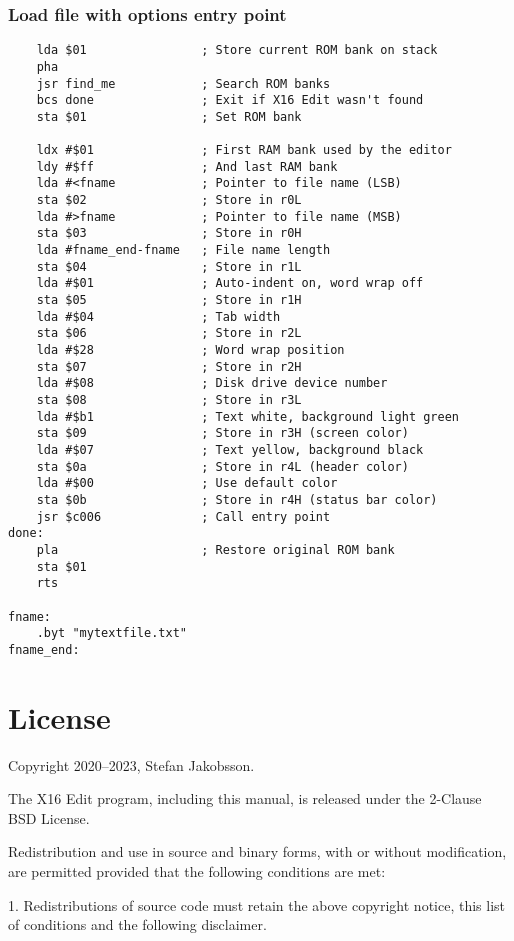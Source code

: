 \documentclass{article}
\begin{document}
    \subsubsection{Load file with options entry point}
\begin{verbatim}
    lda $01                ; Store current ROM bank on stack
    pha
    jsr find_me            ; Search ROM banks
    bcs done               ; Exit if X16 Edit wasn't found
    sta $01                ; Set ROM bank
    
    ldx #$01               ; First RAM bank used by the editor
    ldy #$ff               ; And last RAM bank
    lda #<fname            ; Pointer to file name (LSB)
    sta $02                ; Store in r0L
    lda #>fname            ; Pointer to file name (MSB)
    sta $03                ; Store in r0H
    lda #fname_end-fname   ; File name length
    sta $04                ; Store in r1L
    lda #$01               ; Auto-indent on, word wrap off
    sta $05                ; Store in r1H
    lda #$04               ; Tab width
    sta $06                ; Store in r2L
    lda #$28               ; Word wrap position
    sta $07                ; Store in r2H
    lda #$08               ; Disk drive device number
    sta $08                ; Store in r3L
    lda #$b1               ; Text white, background light green
    sta $09                ; Store in r3H (screen color)
    lda #$07               ; Text yellow, background black
    sta $0a                ; Store in r4L (header color)
    lda #$00               ; Use default color
    sta $0b                ; Store in r4H (status bar color)
    jsr $c006              ; Call entry point
done:
    pla                    ; Restore original ROM bank
    sta $01
    rts
   
fname:
    .byt "mytextfile.txt"
fname_end:
\end{verbatim}

\section{License}
	Copyright 2020--2023, Stefan Jakobsson.

	The X16 Edit program, including this manual, is released under the 2-Clause BSD
    License.
    
    Redistribution and use in source and binary forms, with or without modification, 
    are permitted provided that the following conditions are met:

    1. Redistributions of source code must retain the above copyright notice, this 
       list of conditions and the following disclaimer.
\end{document}
